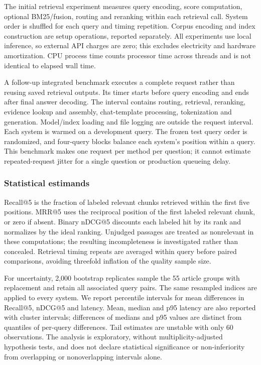 \documentclass[10pt,a4paper]{article}
\begin{document}
The initial retrieval experiment measures query encoding, score
computation, optional BM25/fusion, routing and reranking within each
retrieval call. System order is shuffled for each query and timing
repetition. Corpus encoding and index construction are setup operations,
reported separately. All experiments use local inference, so external
API charges are zero; this excludes electricity and hardware
amortization. CPU process time counts processor time across threads and
is not identical to elapsed wall time.

A follow-up integrated benchmark executes a complete request rather than
reusing saved retrieval outputs. Its timer starts before query encoding
and ends after final answer decoding. The interval contains routing,
retrieval, reranking, evidence lookup and assembly, chat-template
processing, tokenization and generation. Model/index loading and file
logging are outside the request interval. Each system is warmed on a
development query. The frozen test query order is randomized, and
four-query blocks balance each system's position within a query. This
benchmark makes one request per method per question; it cannot estimate
repeated-request jitter for a single question or production queueing
delay.

\hypertarget{statistical-estimands}{%
\subsubsection{Statistical estimands}\label{statistical-estimands}}

Recall@5 is the fraction of labeled relevant chunks retrieved within the
first five positions. MRR@5 uses the reciprocal position of the first
labeled relevant chunk, or zero if absent. Binary nDCG@5 discounts each
labeled hit by its rank and normalizes by the ideal ranking. Unjudged
passages are treated as nonrelevant in these computations; the resulting
incompleteness is investigated rather than concealed. Retrieval timing
repeats are averaged within query before paired comparisons, avoiding
threefold inflation of the quality sample size.

For uncertainty, 2,000 bootstrap replicates sample the 55 article groups
with replacement and retain all associated query pairs. The same
resampled indices are applied to every system. We report percentile
intervals for mean differences in Recall@5, nDCG@5 and latency. Mean,
median and p95 latency are also reported with cluster intervals;
differences of medians and p95 values are distinct from quantiles of
per-query differences. Tail estimates are unstable with only 60
observations. The analysis is exploratory, without multiplicity-adjusted
hypothesis tests, and does not declare statistical significance or
non-inferiority from overlapping or nonoverlapping intervals alone.
\end{document}
